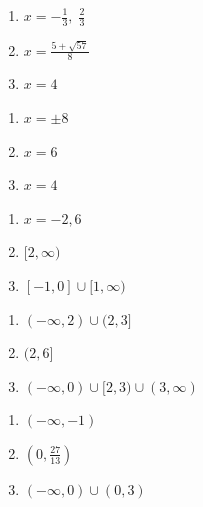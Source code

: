 \begin{multicols}{3}
\begin{enumerate}
\setcounter{enumi}{\value{HW}}


\item  $x = -\frac{1}{3}, \; \frac{2}{3}$
\item $x = \frac{5 + \sqrt{57}}{8}$
\item $x = 4$

\setcounter{HW}{\value{enumi}}
\end{enumerate}
\end{multicols}

\begin{multicols}{3}
\begin{enumerate}
\setcounter{enumi}{\value{HW}}


\item $x = \pm 8$
\item $x = 6$
\item  $x = 4$

\setcounter{HW}{\value{enumi}}
\end{enumerate}
\end{multicols}

\begin{multicols}{3}
\begin{enumerate}
\setcounter{enumi}{\value{HW}}

\item $x=-2, 6$
\item  $[2, \infty)$
\item $[-1, 0] \cup [1, \infty)$

\setcounter{HW}{\value{enumi}}
\end{enumerate}
\end{multicols}

\begin{multicols}{3}
\begin{enumerate}
\setcounter{enumi}{\value{HW}}

\item  $(-\infty, 2) \cup (2,3]$
\item  $(2,6]$
\item $(-\infty, 0) \cup [2,3) \cup (3, \infty)$

\setcounter{HW}{\value{enumi}}
\end{enumerate}
\end{multicols}

\begin{multicols}{3}
\begin{enumerate}
\setcounter{enumi}{\value{HW}}

\item $(-\infty, -1)$
\item $\left(0, \frac{27}{13} \right)$
\item $(-\infty, 0) \cup (0,3)$

\setcounter{HW}{\value{enumi}}
\end{enumerate}
\end{multicols}


